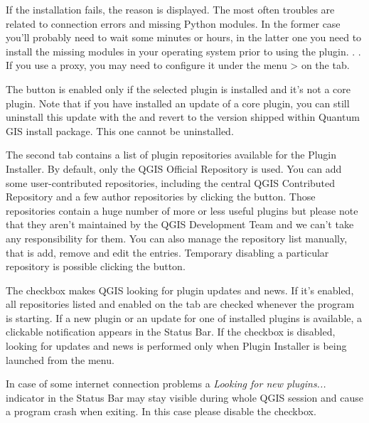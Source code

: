 If the installation fails, the reason is displayed. The most often troubles are related to connection errors and missing Python modules. In the former case you'll probably need to wait some minutes or hours, in the latter one you need to install the missing modules in your operating system prior to using the plugin. . . If you use a proxy, you may need to configure it under the menu  >  on the  tab.

The  button is enabled only if the selected plugin is installed and it's not a core plugin. Note that if you have installed an update of a core plugin, you can still uninstall this update with the  and revert to the version shipped within Quantum GIS install package. This one cannot be uninstalled.


The second tab  contains a list of plugin repositories available for the Plugin Installer. By default, only the QGIS Official Repository is used. You can add some user-contributed repositories, including the central QGIS Contributed Repository and a few author repositories by clicking the  button. Those repositories contain a huge number of more or less useful plugins but please note that they aren't maintained by the QGIS Development Team and we can't take any responsibility for them. You can also manage the repository list manually, that is add, remove and edit the entries. Temporary disabling a particular repository is possible clicking the  button.

The  checkbox makes QGIS looking for plugin updates and news. If it's enabled, all repositories listed and enabled on the  tab are checked whenever the program is starting. If a new plugin or an update for one of installed plugins is available, a clickable notification appears in the Status Bar. If the checkbox is disabled, looking for updates and news is performed only when Plugin Installer is being launched from the menu.

In case of some internet connection problems a \textit{Looking for new plugins...} indicator in the Status Bar may stay visible during whole QGIS session and cause a program crash when exiting. In this case please disable the checkbox.

